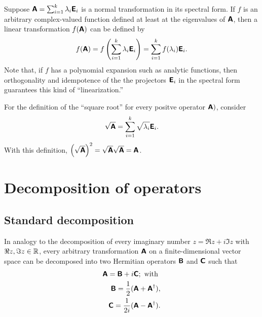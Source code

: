 Suppose $\textsf{\textbf{A}}=\sum_{i=1}^k \lambda_i  \textsf{\textbf{E}}_i $ is a normal transformation
in its spectral form.
If $f$ is an arbitrary complex-valued function defined at least at the eigenvalues of $\textsf{\textbf{A}}$,
then a linear transformation  $f(\textsf{\textbf{A}})$ can be defined by
\begin{equation}
f(\textsf{\textbf{A}})=
f\left(\sum_{i=1}^k \lambda_i \textsf{\textbf{E}}_i\right)
=\sum_{i=1}^k f(\lambda_i)  \textsf{\textbf{E}}_i
 .
\end{equation}
Note that, if $f$ has a polynomial expansion such as analytic functions, then orthogonality and idempotence
of the the projectors $\textsf{\textbf{E}}_i $ in the spectral form guarantees this kind of ``linearization.''

{
\color{blue}
\bexample
For the definition of the ``square root''
for every positve operator $\textsf{\textbf{A}})$, consider
\begin{equation}
\sqrt{\textsf{\textbf{A}}}=\sum_{i=1}^k \sqrt{\lambda_i}  \textsf{\textbf{E}}_i.
\end{equation}
With this definition,
$\left(\sqrt{\textsf{\textbf{A}}}\right)^2=
\sqrt{\textsf{\textbf{A}}}\sqrt{\textsf{\textbf{A}}}= {\textsf{\textbf{A}}}$.
\eexample
}

\section{Decomposition of operators}

\subsection{Standard decomposition}

In analogy to the decomposition of every imaginary number $z= \Re z +i \Im z$ with $\Re z,\Im z\in {\Bbb R}$,
every arbitrary transformation $\textsf{\textbf{A}}$ on a finite-dimensional vector space can be decomposed into two Hermitian operators
$\textsf{\textbf{B}}$
and
$\textsf{\textbf{C}}$
such that
\begin{equation}
\begin{split}
\textsf{\textbf{A}}=\textsf{\textbf{B}} + i \textsf{\textbf{C}}; \textrm{ with }  \\
\textsf{\textbf{B}}=\frac{1}{2}(\textsf{\textbf{A}} +   \textsf{\textbf{A}}^\dagger ), \\
\textsf{\textbf{C}}=\frac{1}{2i}(\textsf{\textbf{A}} -   \textsf{\textbf{A}}^\dagger ).
\end{split}
\end{equation}

